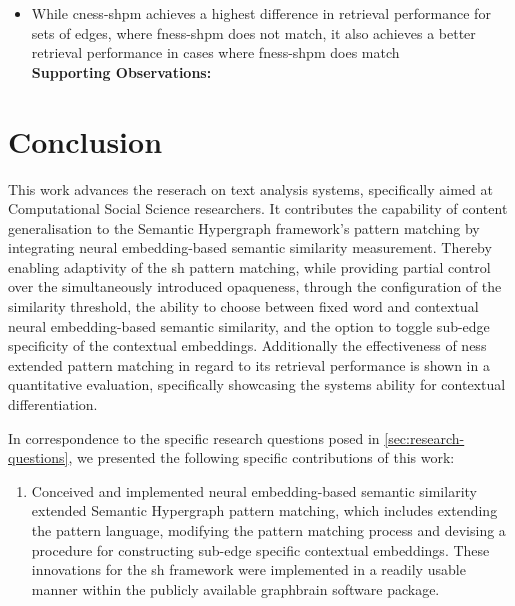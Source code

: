 \documentclass[11pt]{scrreprt}
\begin{document}
{\begin{itemize}
	\item While \gls{cness-shpm} achieves a highest difference in retrieval performance for sets of edges, where \gls{fness-shpm} does not match, it also achieves a better retrieval performance in cases where \gls{fness-shpm} does match \\
	\textbf{Supporting Observations:}  
		
\end{itemize}

\chapter{Conclusion}
\label{cha:conclusion}
This work advances the reserach on text analysis systems, specifically aimed at Computational Social Science researchers. It contributes the capability of content generalisation to the Semantic Hypergraph framework's pattern matching by integrating neural embedding-based semantic similarity measurement. Thereby enabling adaptivity of the \gls{sh} pattern matching, while providing partial control over the simultaneously introduced opaqueness, through the configuration of the similarity threshold, the ability to choose between fixed word and contextual neural embedding-based semantic similarity, and the option to toggle sub-edge specificity of the contextual embeddings. Additionally the effectiveness of \gls{ness} extended pattern matching in regard to its retrieval performance is shown in a quantitative evaluation, specifically showcasing the systems ability for contextual differentiation.

In correspondence to the specific research questions posed in \cref{sec:research-questions}, we presented the following specific  contributions of this work:

\begin{enumerate}[label=\textbf{C.\arabic*}, leftmargin=0pt, labelwidth=*, align=left, labelsep=0.5em, itemindent=0pt, listparindent=\parindent]
\item Conceived and implemented neural embedding-based semantic similarity extended Semantic Hypergraph pattern matching, which includes extending the pattern language, modifying the pattern matching process and devising a procedure for constructing sub-edge specific contextual embeddings. These innovations for the \gls{sh} framework were implemented in a readily usable manner within the publicly available graphbrain software package.


\end{enumerate}}
\end{document}
